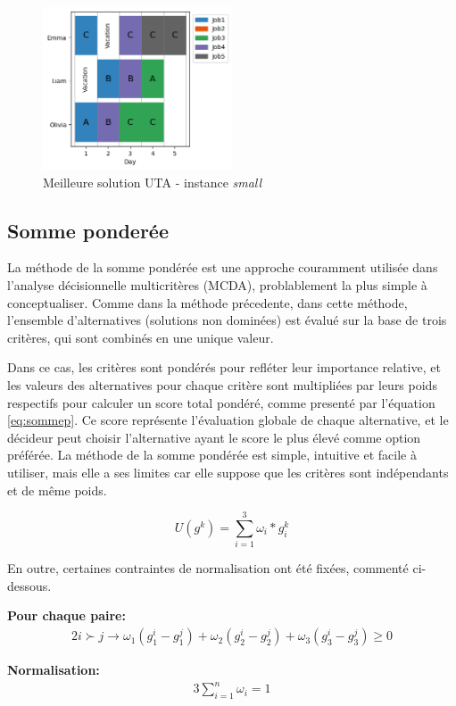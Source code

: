 \documentclass[12pt, a4paper, french, version=last, parskip=half, titlepage]{scrartcl}
\begin{document}
\begin{figure}[H]
\centering
\includegraphics[width=0.5\textwidth]{images/best_uta_small.png}
\caption{Meilleure solution UTA - instance \emph{small}}
\label{fig:uta_small}
\end{figure}    


\subsection{Somme ponderée}

La méthode de la somme pondérée est une approche couramment utilisée dans l'analyse décisionnelle multicritères (MCDA), problablement la plus simple à conceptualiser. Comme dans la méthode précedente, dans cette méthode, l'ensemble d'alternatives (solutions non dominées) est évalué sur la base de trois critères, qui sont combinés en une unique valeur.

Dans ce cas, les critères sont pondérés pour refléter leur importance relative, et les valeurs des alternatives pour chaque critère sont multipliées par leurs poids respectifs pour calculer un score total pondéré, comme presenté par l'équation \ref{eq:sommep}. Ce score représente l'évaluation globale de chaque alternative, et le décideur peut choisir l'alternative ayant le score le plus élevé comme option préférée. La méthode de la somme pondérée est simple, intuitive et facile à utiliser, mais elle a ses limites car elle suppose que les critères sont indépendants et de même poids.

\begin{equation*}
U(g^k) = \sum_{i=1}^3 \omega_i * g_i^k    
\label{eq:sommep}
\end{equation*}

En outre, certaines contraintes de normalisation ont été fixées, commenté ci-dessous.

\begin{tcolorbox}

\textbf{Pour chaque paire:}
\begin{alignat*}{2}
    i \succ j \rightarrow \omega_1(g^i_1 - g^j_1) + \omega_2(g^i_2 - g^j_2) + \omega_3(g^i_3 - g^j_3) \ge 0
 \end{alignat*}

\textbf{Normalisation:}
\begin{alignat*}{3}
    \sum_{i=1}^n \omega_i = 1 
\end{alignat*}
\end{tcolorbox}
\end{document}
